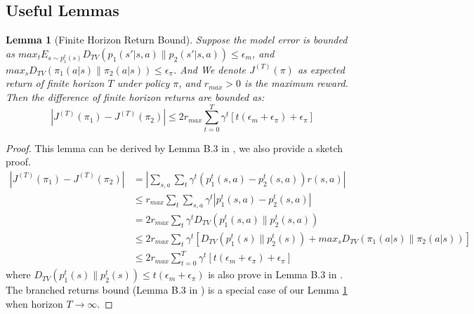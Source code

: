 \documentclass{article}
\newtheorem{lemma}{Lemma}
\begin{document}
\subsection{Useful Lemmas}
\begin{lemma}[Finite Horizon Return Bound]
\label{lemma:finite_return_bound}
Suppose the model error is bounded as $max_t E_{s\sim p_1^t(s)} D_{TV}(p_1(s'|s,a)\| p_2(s'|s,a))\leq \epsilon_m$, and $max_s D_{TV}(\pi_1(a|s)\| \pi_2(a|s))\leq \epsilon_\pi$. And We denote $J^{(T)}(\pi)$ as expected return of finite horizon $T$ under policy $\pi$, and $r_{max}>0$ is the maximum reward. Then the difference of finite horizon returns are bounded as:
\begin{equation*}
    |J^{(T)} (\pi_1) - J^{(T)} (\pi_2)| \leq 2r_{max} \sum_{t=0}^T \gamma^t [t(\epsilon_m + \epsilon_{\pi}) + \epsilon_{\pi}]
\end{equation*}
\end{lemma}
\begin{proof}
    This lemma can be derived by Lemma B.3 in \cite{DBLP:conf/nips/JannerFZL19}, we also provide a sketch proof.
    \begin{equation*}
    \begin{aligned}
        |J^{(T)} (\pi_1) - J^{(T)} (\pi_2)| &= |\sum_{s,a}\sum_{t} \gamma^t (p_1^t(s,a) - p_2^t(s,a))r(s,a)| \\
        &\leq r_{max} \sum_{t}\sum_{s,a} \gamma^t |p_1^t(s,a) - p^t_2(s,a)| \\
        &=2r_{max} \sum_{t}\gamma^t D_{TV}(p^t_1(s,a)\|p^t_2(s,a)) \\ 
        &\leq 2r_{max} \sum_{t}\gamma^t[D_{TV}(p^t_1(s)\|p^t_2(s)) + max_{s}D_{TV}(\pi_1(a|s)\|\pi_2(a|s))] \\
        &\leq 2r_{max} \sum_{t=0}^T \gamma^t [t(\epsilon_m + \epsilon_{\pi}) + \epsilon_{\pi}]
    \end{aligned}
    \end{equation*}
where $D_{TV}(p^t_1(s)\|p^t_2(s)) \leq t(\epsilon_m + \epsilon_{\pi})$ is also prove in Lemma B.3 in \cite{DBLP:conf/nips/JannerFZL19}. The branched returns bound (Lemma B.3 in \cite{DBLP:conf/nips/JannerFZL19}) is a special case of our Lemma \ref{lemma:finite_return_bound} when horizon $T \to \infty$.
\end{proof}
\end{document}
